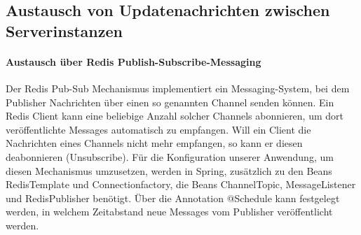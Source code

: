 \subsection{Austausch von Updatenachrichten zwischen
Serverinstanzen}
\paragraph{Austausch über Redis Publish-Subscribe-Messaging}
Der Redis Pub-Sub Mechanismus implementiert ein Messaging-System, bei dem Publisher Nachrichten
über einen so genannten Channel senden können. Ein Redis Client kann eine beliebige Anzahl solcher Channels
abonnieren, um dort veröffentlichte Messages automatisch zu empfangen. Will ein Client die Nachrichten eines Channels
nicht mehr empfangen, so kann er diesen deabonnieren (Unsubscribe).
Für die Konfiguration unserer Anwendung, um diesen Mechanismus umzusetzen, werden in Spring, zusätzlich zu den Beans RedisTemplate und Connectionfactory,
die Beans ChannelTopic, MessageListener und RedisPublisher benötigt. Über die Annotation @Schedule kann festgelegt werden, in welchem
Zeitabstand neue Messages vom Publisher veröffentlicht werden.
